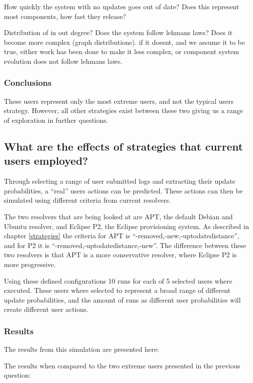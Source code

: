 How quickly the system with no updates goes out of date?
Does this represent most components, how fast they release?

Distribution of in out degree?
Does the system follow lehmans laws?
Does it become more complex (graph distributions).
if it doesnt, and we assume it to be true, either work has been done to make it less complex, or component system evolution does not follow lehmans laws.

\subsubsection{Conclusions}
These users represent only the most extreme users, and not the typical users strategy.
However, all other strategies exist between these two giving us a range of exploration in further questions.

\subsection{What are the effects of strategies that current users employed?}
Through selecting a range of user submitted logs and extracting their update probabilities, a ``real'' users actions can be predicted.
These actions can then be simulated using different criteria from current resolvers.

The two resolvers that are being looked at are APT, the default Debian and Ubuntu resolver, and Eclipse P2, the Eclipse provisioning system.
As described in chapter \ref{strategies} the criteria for APT is ``-removed,-new,-uptodatedistance'', and for P2 it is ``-removed,-uptodatedistance,-new''.
The difference between these two resolvers is that APT is a more conservative resolver, where Eclipse P2 is more progressive.

Using these defined configurations 10 runs for each of 5 selected users where executed. 
These users where selected to represent a broad range of different update probabilities, and the amount of runs as different user probabilities will create different user actions.

\subsubsection{Results}
The results from this simulation are presented here:

The results when compared to the two extreme users presented in the previous question:

